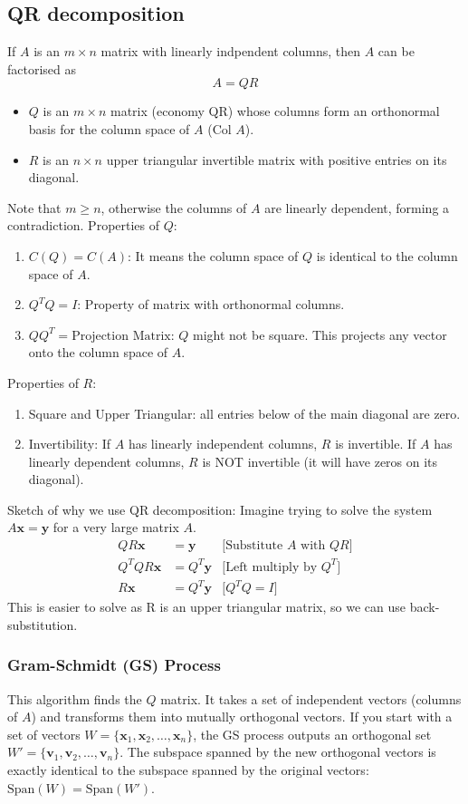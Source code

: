 \documentclass[../linear-algebra.tex]{subfiles}
\begin{document}
\subsection{QR decomposition}
If $A$ is an $m \times n$ matrix with linearly indpendent columns, then $A$ can be factorised as
$$A = QR$$
\begin{itemize}
    \item $Q$ is an $m \times n$ matrix (economy QR) whose columns form an orthonormal basis for the column space of $A$ (Col $A$).
    \item $R$ is an $n \times n$ upper triangular invertible matrix with positive entries on its diagonal.
\end{itemize}
Note that $m \geq n$, otherwise the columns of $A$ are linearly dependent, forming a contradiction.\newline
Properties of $Q$:
\begin{enumerate}
    \item $C(Q) = C(A)$: It means the column space of $Q$ is identical to the column space of $A$.
    \item $Q^T Q = I$: Property of matrix with orthonormal columns.
    \item $QQ^T = \text{Projection Matrix}$: $Q$ might not be square. This projects any vector onto the column space of $A$.
\end{enumerate}
Properties of $R$:
\begin{enumerate}
    \item Square and Upper Triangular: all entries below of the main diagonal are zero.
    \item Invertibility: If $A$ has linearly independent columns, $R$ is invertible. If $A$ has linearly dependent columns, $R$ is NOT invertible (it will have zeros on its diagonal).
\end{enumerate}
Sketch of why we use QR decomposition: Imagine trying to solve the system $A\mathbf{x} = \mathbf{y}$ for a very large matrix $A$.
\begin{align*}
    QR\mathbf{x} &= \mathbf{y} & \text{[Substitute $A$ with $QR$]}\\
    Q^T Q R \mathbf{x} &= Q^T \mathbf{y} & \text{[Left multiply by $Q^T$]}\\
    R\mathbf{x} &= Q^T \mathbf{y} & \text{[$Q^TQ=I$]}
\end{align*}
This is easier to solve as R is an upper triangular matrix, so we can use back-substitution.
\subsubsection{Gram-Schmidt (GS) Process}
This algorithm finds the $Q$ matrix. It takes a set of independent vectors (columns of $A$) and transforms them into mutually orthogonal vectors.\newline
If you start with a set of vectors $W = \{\mathbf{x}_1, \mathbf{x}_2, \dots, \mathbf{x}_n\}$, the GS process outputs an orthogonal set $W' = \{\mathbf{v}_1, \mathbf{v}_2, \dots, \mathbf{v}_n\}$. The subspace spanned by the new orthogonal vectors is exactly identical to the subspace spanned by the original vectors: $\text{Span}(W) = \text{Span}(W')$.
\end{document}
